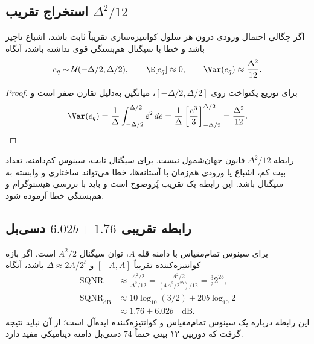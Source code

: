 \subsection{استخراج تقریب \(\Delta^2/12\)}

\begin{proposition}
اگر چگالی احتمال ورودی درون هر سلول کوانتیزه‌سازی تقریباً ثابت باشد، اشباع ناچیز باشد و
خطا با سیگنال هم‌بستگی قوی نداشته باشد، آنگاه
\begin{equation}
e_q\sim\mathcal U(-\Delta/2,\Delta/2),
\qquad \E[e_q]\approx0,
\qquad \Var(e_q)\approx\frac{\Delta^2}{12}.
\label{eq:quantization-noise}
\end{equation}
\end{proposition}

\begin{proof}
برای توزیع یکنواخت روی \([-\Delta/2,\Delta/2]\)، میانگین به‌دلیل تقارن صفر است و
\begin{equation}
\Var(e_q)=\frac{1}{\Delta}
\int_{-\Delta/2}^{\Delta/2}e^2\,de
=\frac{1}{\Delta}\left[\frac{e^3}{3}\right]_{-\Delta/2}^{\Delta/2}
=\frac{\Delta^2}{12}.
\end{equation}
\end{proof}

\begin{warningbox}
رابطه \(\Delta^2/12\) قانون جهان‌شمول نیست. برای سیگنال ثابت، سینوس کم‌دامنه، تعداد بیت کم،
اشباع یا ورودی هم‌زمان با آستانه‌ها، خطا می‌تواند ساختاری و وابسته به سیگنال باشد. این رابطه یک
تقریب پُروضوح است و باید با بررسی هیستوگرام و هم‌بستگی خطا آزموده شود.
\end{warningbox}

\subsection{رابطه تقریبی \(6.02b+1.76\) دسی‌بل}

برای سینوس تمام‌مقیاس با دامنه قله \(A\)، توان سیگنال \(A^2/2\) است. اگر بازه کوانتیزه‌کننده
تقریباً \([-A,A]\) و \(\Delta\approx2A/2^b\) باشد، آنگاه
\begin{align}
\operatorname{SQNR}
&\approx\frac{A^2/2}{\Delta^2/12}
=\frac{A^2/2}{(4A^2/2^{2b})/12}
=\frac{3}{2}2^{2b},\\
\operatorname{SQNR}_{\mathrm{dB}}
&\approx10\log_{10}(3/2)+20b\log_{10}2\\
&\approx1.76+6.02b\quad\mathrm{dB}.
\label{eq:sqnr-bits}
\end{align}
این رابطه درباره یک سینوس تمام‌مقیاس و کوانتیزه‌کننده ایده‌آل است؛ از آن نباید نتیجه گرفت که
دوربین ۱۲ بیتی حتماً \(74\) دسی‌بل دامنه دینامیکی مفید دارد.

